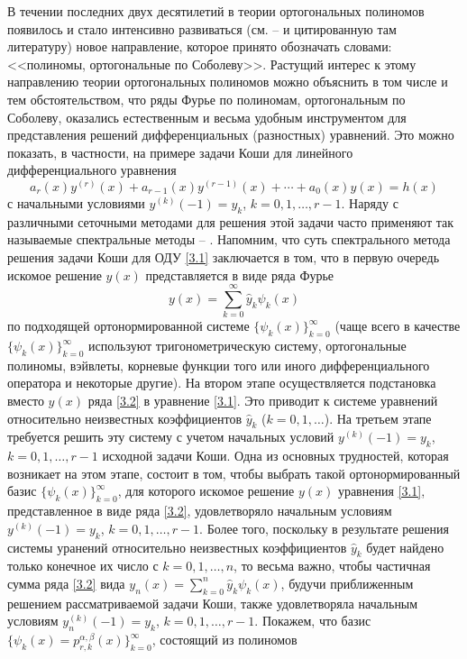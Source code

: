 В течении последних двух десятилетий в теории ортогональных полиномов появилось и стало
интенсивно развиваться (см. \cite{KwonLittl1} -- \cite{Shar2016} и цитированную там литературу) новое направление, которое принято обозначать словами: <<полиномы, ортогональные по Соболеву>>. Растущий интерес  к этому направлению теории ортогональных полиномов можно объяснить в том числе и тем обстоятельством, что ряды Фурье по полиномам, ортогональным по Соболеву, оказались естественным и весьма удобным инструментом для представления решений  дифференциальных (разностных) уравнений. Это можно показать, в частности, на примере  задачи Коши для линейного дифференциального уравнения
\begin{equation}\label{3.1}
 a_r(x)y^{(r)}(x)+a_{r-1}(x)y^{(r-1)}(x)+\cdots+a_0(x)y(x)=h(x)
 \end{equation}
с начальными условиями $y^{(k)}(-1)=y_k$, $k=0,1,\ldots,r-1$.  Наряду с различными сеточными методами для решения этой задачи часто применяют так называемые спектральные методы \cite{Tref1} -- \cite{MMG2016}. Напомним, что суть спектрального метода решения задачи Коши  для ОДУ \eqref{3.1} заключается в том, что в первую очередь искомое решение $y(x)$ представляется в виде ряда Фурье
\begin{equation}\label{3.2}
 y(x)=\sum_{k=0}^\infty \hat y_k\psi_k(x)
 \end{equation}
по подходящей ортонормированной системе $\{\psi_k(x)\}_{k=0}^\infty$ (чаще всего в качестве $\{\psi_k(x)\}_{k=0}^\infty$ используют    тригонометрическую систему, ортогональные полиномы, вэйвлеты, корневые функции того или иного дифференциального оператора  и некоторые другие). На втором этапе осуществляется подстановка вместо $y(x)$ ряда \eqref{3.2} в уравнение \eqref{3.1}. Это приводит к системе уравнений относительно неизвестных коэффициентов $\hat y_k$ ($k=0,1,\ldots$). На третьем этапе требуется решить эту систему с учетом начальных условий  $y^{(
k)}(-1)=y_k$, $k=0,1,\ldots,r-1$ исходной задачи Коши.
Одна из основных трудностей, которая возникает на этом этапе, состоит в том, чтобы
выбрать такой ортонормированный базис $\{\psi_k(x)\}_{k=0}^\infty$, для которого искомое решение $y(x)$ уравнения \eqref{3.1}, представленное в виде ряда  \eqref{3.2}, удовлетворяло начальным условиям $y^{(k)}(-1)=y_k$, $k=0,1,\ldots,r-1$. Более того, поскольку в результате решения системы уранений относительно неизвестных коэффициентов $\hat y_k$  будет найдено только конечное их число с $k=0,1,\ldots, n$, то весьма важно, чтобы частичная сумма ряда \eqref{3.2} вида
$ y_n(x)=\sum_{k=0}^n\hat y_k\psi_k(x)$, будучи приближенным решением рассматриваемой задачи Коши, также удовлетворяла  начальным условиям $y_n^{(k)}(-1)=y_k$, $k=0,1,\ldots,r-1$. Покажем, что  базис $\{\psi_k(x)=p_{r,k}^{\alpha,\beta}(x)\}_{k=0}^\infty$, состоящий из полиномов

